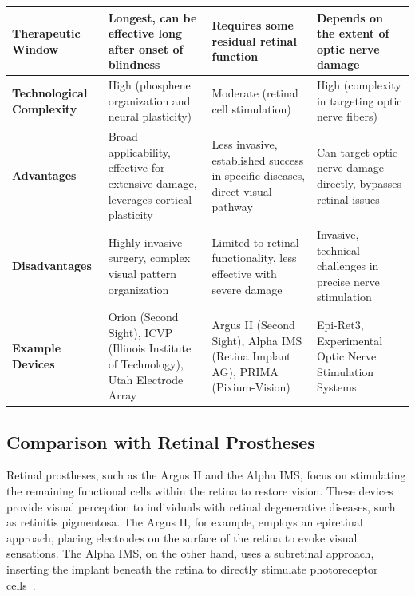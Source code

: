 \documentclass[twocolumn,10pt]{article}
\begin{document}
\begin{table}[ht!]
\begin{tabularx}{\textwidth}{X X X X}
            \textbf{Therapeutic \newline Window}         & Longest, can be effective long after onset of blindness                             & Requires some residual retinal function                                        & Depends on the extent of optic nerve damage                     \\ \hline
            \textbf{Technological \newline Complexity}   & High (phosphene organization and neural plasticity)                                 & Moderate (retinal cell stimulation)                                            & High (complexity in targeting optic nerve fibers)               \\ \hline
            \textbf{Advantages}                          & Broad applicability, effective for extensive damage, leverages cortical plasticity  & Less invasive, established success in specific diseases, direct visual pathway & Can target optic nerve damage directly, bypasses retinal issues \\ \hline
            \textbf{Disadvantages}                       & Highly invasive
            surgery, complex visual pattern organization &
            Limited to retinal functionality, less effective with severe damage
                                                         & Invasive, technical challenges in precise nerve stimulation                                                                                                                                                                            \\
            \hline
            \textbf{Example Devices}                     & Orion (Second Sight), ICVP (Illinois Institute of Technology), Utah Electrode Array & Argus II (Second Sight), Alpha IMS (Retina Implant AG), PRIMA (Pixium-Vision)  & Epi-Ret3, Experimental Optic Nerve Stimulation Systems          \\ \hline
      \end{tabularx}
\end{table}

\subsection*{Comparison with Retinal Prostheses}
Retinal prostheses, such as the Argus II and the Alpha IMS, focus on stimulating the remaining functional cells within the retina to restore vision. These devices provide visual perception to individuals with retinal degenerative diseases, such as retinitis pigmentosa. The Argus II, for example, employs an epiretinal approach, placing electrodes on the surface of the retina to evoke visual sensations. The Alpha IMS, on the other hand, uses a subretinal approach, inserting the implant beneath the retina to directly stimulate photoreceptor cells~\parencite{stinglArtificialVisionWirelessly2013}.
\end{document}
